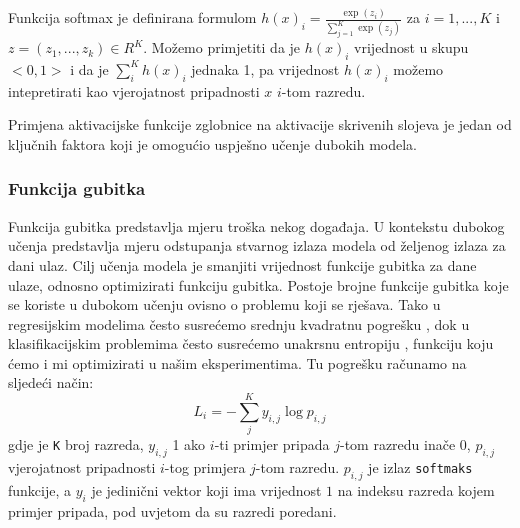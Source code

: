 \documentclass[times, utf8, diplomski,  numeric]{fer}
\begin{document}
\par
Funkcija softmax je definirana formulom $h(x)_i=\frac{\exp(z_i)}{\sum_{j=1}^K \exp(z_j)}$ za $i = 1,...,K$ i $z=(z_1,...,z_k) \in R^K$. Možemo primjetiti da je $h(x)_i$ vrijednost u skupu $<0,1>$ i da je $\sum_{i}^{K} h(x)_i$ jednaka 1, pa vrijednost $h(x)_i$ možemo intepretirati kao vjerojatnost pripadnosti $x$ $i$-tom razredu.
\par
Primjena aktivacijske funkcije zglobnice na aktivacije skrivenih slojeva je jedan od ključnih faktora koji je omogućio uspješno učenje dubokih modela. 
\subsubsection{Funkcija gubitka}
Funkcija gubitka predstavlja mjeru troška nekog događaja. U kontekstu dubokog učenja predstavlja mjeru odstupanja stvarnog izlaza modela od željenog izlaza za dani ulaz. Cilj učenja modela je smanjiti vrijednost funkcije gubitka za dane ulaze, odnosno optimizirati funkciju gubitka. Postoje brojne funkcije gubitka koje se koriste u dubokom učenju ovisno o problemu koji se rješava. Tako u regresijskim modelima često susrećemo srednju kvadratnu pogrešku , dok u klasifikacijskim problemima često susrećemo unakrsnu entropiju , funkciju koju ćemo i mi optimizirati u našim eksperimentima. Tu pogrešku računamo na sljedeći način: 
\begin{equation}
L_{i} = - \sum_{j}^{K} y_{i,j} \log{p_{i,j}} 
\end{equation}
gdje je \verb|K| broj razreda, $y_{i,j}$ 1 ako $i$-ti primjer pripada $j$-tom razredu inače 0, $p_{i,j}$ vjerojatnost pripadnosti $i$-tog primjera $j$-tom razredu. $p_{i,j}$ je izlaz \verb|softmaks| funkcije, a $y_{i}$ je jedinični vektor koji ima vrijednost $1$ na indeksu razreda kojem primjer pripada, pod uvjetom da su razredi poredani.
\end{document}
